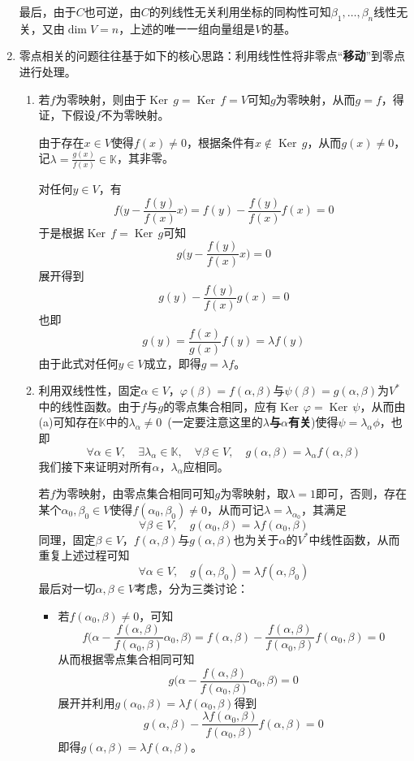 \documentclass[a4paper,UTF8,fontset=windows,AutoFakeBold]{ctexart}
\DeclareMathOperator{\Ker}{Ker\,}
\begin{document}
\begin{enumerate}
    最后，由于$C$也可逆，由$C$的列线性无关利用坐标的同构性可知$\beta_1,\dots,\beta_n$线性无关，又由$\dim V=n$，上述的唯一一组向量组是$V$的基。

    \item
    零点相关的问题往往基于如下的核心思路：利用线性性将非零点``\textbf{移动}''到零点进行处理。
    \begin{enumerate}
        \item 若$f$为零映射，则由于$\Ker g=\Ker f=V$可知$g$为零映射，从而$g=f$，得证，下假设$f$不为零映射。
        
        由于存在$x\in V$使得$f(x)\ne 0$，根据条件有$x\notin\Ker g$，从而$g(x)\ne0$，记$\lambda=\frac{g(x)}{f(x)}\in\mathbb{K}$，其非零。

        对任何$y\in V$，有
        $$f\bigg(y-\frac{f(y)}{f(x)}x\bigg)=f(y)-\frac{f(y)}{f(x)}f(x)=0$$
        于是根据$\Ker f=\Ker g$可知
        $$g\bigg(y-\frac{f(y)}{f(x)}x\bigg)=0$$
        展开得到
        $$g(y)-\frac{f(y)}{f(x)}g(x)=0$$
        也即
        $$g(y)=\frac{f(x)}{g(x)}f(y)=\lambda f(y)$$
        由于此式对任何$y\in V$成立，即得$g=\lambda f$。

        \item 利用双线性性，固定$\alpha\in V$，$\varphi(\beta)=f(\alpha,\beta)$与$\psi(\beta)=g(\alpha,\beta)$为$V^*$中的线性函数。由于$f$与$g$的零点集合相同，应有$\Ker\varphi=\Ker\psi$，从而由(a)可知存在$\mathbb{K}$中的$\lambda_\alpha\ne0$\ (一定要注意这里的$\lambda$\textbf{与$\alpha$有关})使得$\psi=\lambda_\alpha\phi$，也即
        $$\forall\alpha\in V,\quad\exists\lambda_\alpha\in\mathbb{K},\quad\forall\beta\in V,\quad g(\alpha,\beta)=\lambda_\alpha f(\alpha,\beta)$$
        我们接下来证明对所有$\alpha$，$\lambda_\alpha$应相同。

        若$f$为零映射，由零点集合相同可知$g$为零映射，取$\lambda=1$即可，否则，存在某个$\alpha_0,\beta_0\in V$使得$f(\alpha_0,\beta_0)\ne0$，从而可记$\lambda=\lambda_{\alpha_0}$，其满足
        $$\forall\beta\in V,\quad g(\alpha_0,\beta)=\lambda f(\alpha_0,\beta)$$
        同理，固定$\beta\in V$，$f(\alpha,\beta)$与$g(\alpha,\beta)$也为关于$\alpha$的$V^*$中线性函数，从而重复上述过程可知
        $$\forall\alpha\in V,\quad g(\alpha,\beta_0)=\lambda f(\alpha,\beta_0)$$
        最后对一切$\alpha,\beta\in V$考虑，分为三类讨论：
        \begin{itemize}
            \item 若$f(\alpha_0,\beta)\ne0$，可知
            $$f\bigg(\alpha-\frac{f(\alpha,\beta)}{f(\alpha_0,\beta)}\alpha_0,\beta\bigg)=f(\alpha,\beta)-\frac{f(\alpha,\beta)}{f(\alpha_0,\beta)}f(\alpha_0,\beta)=0$$
            从而根据零点集合相同可知
            $$g\bigg(\alpha-\frac{f(\alpha,\beta)}{f(\alpha_0,\beta)}\alpha_0,\beta\bigg)=0$$
            展开并利用$g(\alpha_0,\beta)=\lambda f(\alpha_0,\beta)$得到
            $$g(\alpha,\beta)-\frac{\lambda f(\alpha_0,\beta)}{f(\alpha_0,\beta)}f(\alpha,\beta)=0$$
            即得$g(\alpha,\beta)=\lambda f(\alpha,\beta)$。


\end{itemize}
\end{enumerate}
\end{enumerate}
\end{document}
